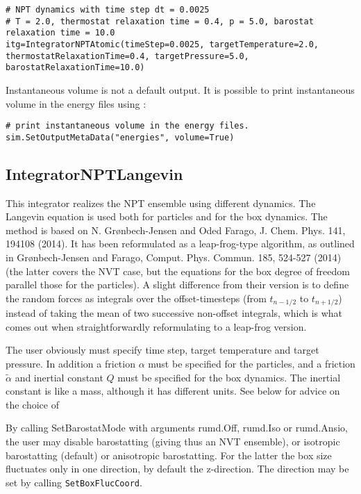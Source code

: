 \documentclass[a4paper]{article}
\begin{document}
\begin{verbatim}
# NPT dynamics with time step dt = 0.0025
# T = 2.0, thermostat relaxation time = 0.4, p = 5.0, barostat relaxation time = 10.0
itg=IntegratorNPTAtomic(timeStep=0.0025, targetTemperature=2.0,
thermostatRelaxationTime=0.4, targetPressure=5.0, barostatRelaxationTime=10.0)
\end{verbatim}

Instantaneous volume is not a default output. It is possible to print instantaneous volume in the energy files using :

\begin{verbatim}
# print instantaneous volume in the energy files. 
sim.SetOutputMetaData("energies", volume=True)
\end{verbatim}

\subsection{IntegratorNPTLangevin}

This integrator realizes the NPT ensemble using different dynamics. The Langevin equation is used both for particles and for the box dynamics. The method is based on N. Gr{\o}nbech-Jensen and Oded Farago, J. Chem. Phys. 141, 194108 (2014). It has been reformulated as a leap-frog-type algorithm, as outlined in Gr{\o}nbech-Jensen and Farago, Comput. Phys. Commun. 185, 524-527 (2014) (the latter covers the NVT case, but the equations for the box degree of freedom parallel those for the particles). A slight difference from their version is to define the random forces as integrals over the offset-timesteps (from $t_{n-1/2}$ to $t_{n+1/2}$)
instead of taking the mean of two successive non-offset integrals, which is what comes out when straightforwardly reformulating to a leap-frog version.

The user obviously must specify time step, target temperature and target pressure. In addition a friction $\alpha$ must be specified for the particles, and a friction  $\tilde \alpha$ and inertial constant $Q$ must be specified for the box dynamics. The inertial constant is like a mass, although it has different units. See below for advice on the choice of 

By calling SetBarostatMode with arguments rumd.Off, rumd.Iso or rumd.Ansio, the user may disable barostatting (giving thus an NVT ensemble), or isotropic barostatting (default) or anisotropic barostatting. For the latter the box size fluctuates only in one direction, by default the z-direction. The direction may be set by calling \verb|SetBoxFlucCoord|.
\end{document}
